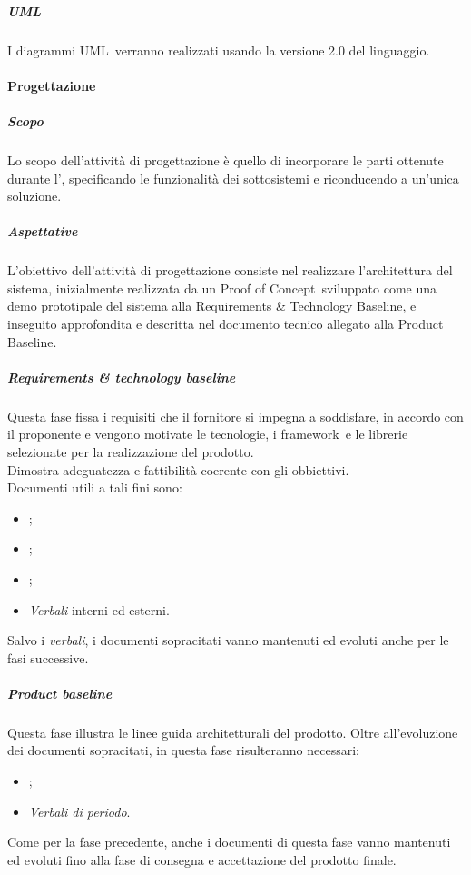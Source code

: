             \subparagraph{UML} \label{subparagraph:UML}
            I diagrammi UML\glo\ verranno realizzati usando la versione 2.0 del linguaggio.
          
        \paragraph{Progettazione} \label{paragraph:Progettazione}

            \subparagraph{Scopo} \label{subparagraph:Progettazione_Scopo}
            Lo scopo dell'attività di progettazione è quello di incorporare le parti ottenute durante l'\docNameAdRLow, specificando le funzionalità dei sottosistemi
            e riconducendo a un’unica soluzione. 

            \subparagraph{Aspettative} \label{subparagraph:Progettazione_Aspettative}
            L’obiettivo dell’attività di progettazione consiste nel realizzare l’architettura del sistema, inizialmente realizzata da un Proof of Concept\glo\ sviluppato come
            una demo prototipale del sistema alla Requirements \& Technology Baseline, e inseguito approfondita e descritta nel documento tecnico allegato alla Product Baseline.

            \subparagraph{Requirements \& technology baseline} \label{subparagraph:Requirements & technology baseline}
            Questa fase fissa i requisiti che il fornitore si impegna a soddisfare, in accordo con il proponente e vengono motivate le tecnologie,
            i framework\glo\ e le librerie selezionate per la realizzazione del prodotto.\\
            Dimostra adeguatezza e fattibilità coerente con gli obbiettivi.\\
            Documenti utili a tali fini sono:
            \begin{itemize}
                \item \docNamePdP;
                \item \docNamePdQ;
                \item \docNameNdP;
                \item \textit{Verbali} interni ed esterni.
            \end{itemize}
            Salvo i \textit{verbali}, i documenti sopracitati vanno mantenuti ed evoluti anche per le fasi successive.\\


            \subparagraph{Product baseline} \label{subparagraph:Product baseline}
            Questa fase illustra le linee guida architetturali del prodotto.
            Oltre all'evoluzione dei documenti sopracitati, in questa fase risulteranno necessari:
            \begin{itemize}
                \item \docNameMU;
                \item \textit{Verbali di periodo}.
            \end{itemize}
            Come per la fase precedente, anche i documenti di questa fase vanno mantenuti ed evoluti fino alla fase di consegna e accettazione del prodotto finale.

